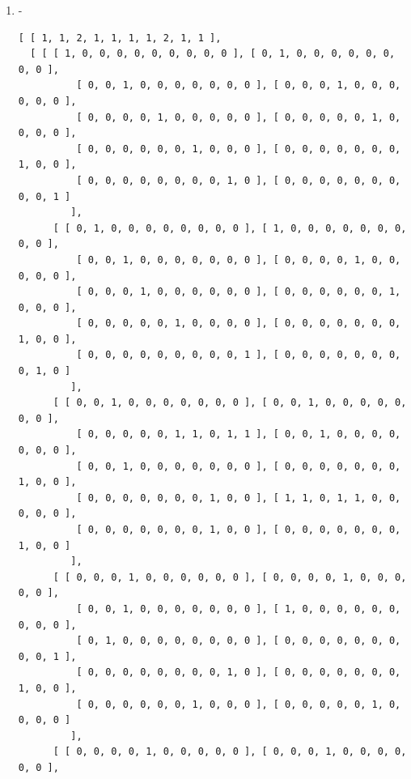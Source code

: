 \documentclass[a4paper, 10pt]{book}
\theoremstyle{definition}
\numberwithin{equation}{chapter}
\begin{document}
\begin{appendices}
\begin{enumerate}
\begin{lstlisting}[numbers=none]
          [ 0, 0, 0, 0, 0, 0, 0, 1, 0, 0 ], [ 0, 0, 0, 0, 0, 0, 1, 0, 0, 0 ], 
          [ 0, 0, 0, 0, 0, 1, 0, 0, 0, 0 ], 
          [ 0, 0, 0, 1, 0, 0, 0, 0, 0, 0 ], [ 0, 0, 0, 0, 1, 0, 0, 0, 0, 0 ], 
          [ 0, 0, 1, 0, 0, 0, 0, 0, 0, 0 ], 
          [ 0, 1, 0, 0, 0, 0, 0, 0, 0, 0 ], [ 1, 0, 0, 0, 0, 0, 0, 0, 0, 0 ] ], 
      [ [ 0, 0, 0, 0, 0, 0, 0, 0, 0, 1 ], [ 0, 0, 0, 0, 0, 0, 0, 0, 1, 0 ], 
      [ 0, 0, 0, 0, 0, 0, 0, 1, 0, 0 ], 
          [ 0, 0, 0, 0, 0, 1, 0, 0, 0, 0 ], [ 0, 0, 0, 0, 0, 0, 1, 0, 0, 0 ],
           [ 0, 0, 0, 0, 1, 0, 0, 0, 0, 0 ], 
          [ 0, 0, 0, 1, 0, 0, 0, 0, 0, 0 ], [ 0, 0, 1, 0, 0, 0, 0, 0, 0, 0 ], 
          [ 1, 0, 0, 0, 0, 0, 0, 0, 0, 0 ], 
          [ 0, 1, 0, 0, 0, 0, 0, 0, 0, 0 ] ] ] ]
	\end{lstlisting}
\iffalse	\item -\begin{lstlisting}[numbers=none]
	[ [ 1, 1, 2, 1, 1, 1, 1, 2, 1, 1 ], 
  [ [ [ 1, 0, 0, 0, 0, 0, 0, 0, 0, 0 ], [ 0, 1, 0, 0, 0, 0, 0, 0, 0, 0 ], 
          [ 0, 0, 1, 0, 0, 0, 0, 0, 0, 0 ], [ 0, 0, 0, 1, 0, 0, 0, 0, 0, 0 ],
          [ 0, 0, 0, 0, 1, 0, 0, 0, 0, 0 ], [ 0, 0, 0, 0, 0, 1, 0, 0, 0, 0 ],
          [ 0, 0, 0, 0, 0, 0, 1, 0, 0, 0 ], [ 0, 0, 0, 0, 0, 0, 0, 1, 0, 0 ],
          [ 0, 0, 0, 0, 0, 0, 0, 0, 1, 0 ], [ 0, 0, 0, 0, 0, 0, 0, 0, 0, 1 ] 
         ], 
      [ [ 0, 1, 0, 0, 0, 0, 0, 0, 0, 0 ], [ 1, 0, 0, 0, 0, 0, 0, 0, 0, 0 ], 
          [ 0, 0, 1, 0, 0, 0, 0, 0, 0, 0 ], [ 0, 0, 0, 0, 1, 0, 0, 0, 0, 0 ],
          [ 0, 0, 0, 1, 0, 0, 0, 0, 0, 0 ], [ 0, 0, 0, 0, 0, 0, 1, 0, 0, 0 ],
          [ 0, 0, 0, 0, 0, 1, 0, 0, 0, 0 ], [ 0, 0, 0, 0, 0, 0, 0, 1, 0, 0 ],
          [ 0, 0, 0, 0, 0, 0, 0, 0, 0, 1 ], [ 0, 0, 0, 0, 0, 0, 0, 0, 1, 0 ] 
         ], 
      [ [ 0, 0, 1, 0, 0, 0, 0, 0, 0, 0 ], [ 0, 0, 1, 0, 0, 0, 0, 0, 0, 0 ], 
          [ 0, 0, 0, 0, 0, 1, 1, 0, 1, 1 ], [ 0, 0, 1, 0, 0, 0, 0, 0, 0, 0 ],
          [ 0, 0, 1, 0, 0, 0, 0, 0, 0, 0 ], [ 0, 0, 0, 0, 0, 0, 0, 1, 0, 0 ],
          [ 0, 0, 0, 0, 0, 0, 0, 1, 0, 0 ], [ 1, 1, 0, 1, 1, 0, 0, 0, 0, 0 ],
          [ 0, 0, 0, 0, 0, 0, 0, 1, 0, 0 ], [ 0, 0, 0, 0, 0, 0, 0, 1, 0, 0 ] 
         ], 
      [ [ 0, 0, 0, 1, 0, 0, 0, 0, 0, 0 ], [ 0, 0, 0, 0, 1, 0, 0, 0, 0, 0 ], 
          [ 0, 0, 1, 0, 0, 0, 0, 0, 0, 0 ], [ 1, 0, 0, 0, 0, 0, 0, 0, 0, 0 ],
          [ 0, 1, 0, 0, 0, 0, 0, 0, 0, 0 ], [ 0, 0, 0, 0, 0, 0, 0, 0, 0, 1 ],
          [ 0, 0, 0, 0, 0, 0, 0, 0, 1, 0 ], [ 0, 0, 0, 0, 0, 0, 0, 1, 0, 0 ],
          [ 0, 0, 0, 0, 0, 0, 1, 0, 0, 0 ], [ 0, 0, 0, 0, 0, 1, 0, 0, 0, 0 ] 
         ], 
      [ [ 0, 0, 0, 0, 1, 0, 0, 0, 0, 0 ], [ 0, 0, 0, 1, 0, 0, 0, 0, 0, 0 ], 

\end{lstlisting}
\end{enumerate}
\end{appendices}
\end{document}
